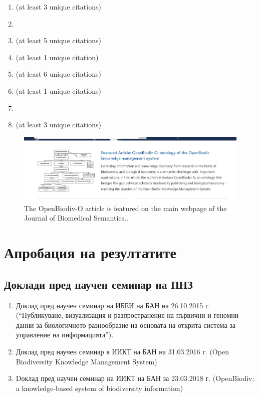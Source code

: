 \begingroup
{}
\setcounter{count}{99}
%

\begin{enumerate}
\item {} (at least 3 unique citations)
\item {}
\item {} (at least 5 unique citations)
\item {} (at least 1 unique citation)
\item {} (at least 6 unique citations)
\item {} (at least 1 unique citations)
\item {} 
\item {} (at least 3 unique citations)
\end{enumerate}
\endgroup

\begin{figure}
\centering
\includegraphics[width=\textwidth]{Figures/JBS-featured.jpg}
\decoRule
\caption{The OpenBiodiv-O article is featured on the main webpage of the Journal of Biomedical Semantics..}
\label{fig:jbs-featured}
\end{figure}

\section*{Апробация на резултатите}

\subsection*{Доклади пред научен семинар на ПНЗ}

\begin{enumerate}
    \item Доклад пред научен семинар на ИБЕИ на БАН на 26.10.2015 г. (“Публикуване, визуализация и разпространение на първични и геномни данни за биологичното разнообразие на основата на открита система за управление на информацията”).
    \item Доклад пред научен семинар в ИИКТ на БАН на 31.03.2016 г. (Open Biodiversity Knowledge Management System)
    \item Dоклад пред научен семинар на ИИКТ на БАН за 23.03.2018 г. (OpenBiodiv: a knowledge-based system of biodiversity information)
\end{enumerate}

